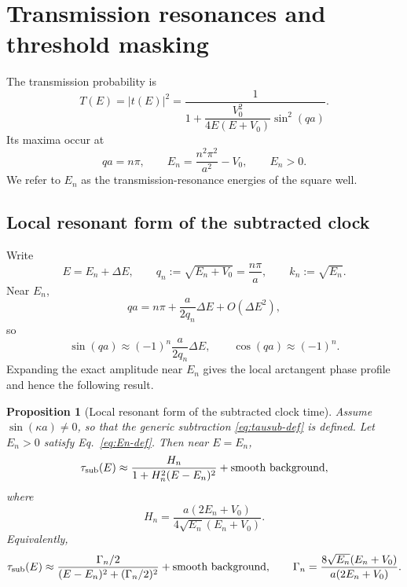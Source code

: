 \documentclass[aps,pra,preprint,notitlepage,nofootinbib]{revtex4-2}
\newtheorem{proposition}{Proposition}
\begin{document}
\section{Transmission resonances and threshold masking}
\label{sec:resonances}

The transmission probability is
\begin{equation}
T(E)=|t(E)|^2=
\frac{1}{1+\dfrac{V_0^2}{4E(E+V_0)}\sin^2(qa)}.
\label{eq:T-exact}
\end{equation}
Its maxima occur at
\begin{equation}
qa=n\pi,
\qquad
E_n=\frac{n^2\pi^2}{a^2}-V_0,
\qquad E_n>0.
\label{eq:En-def}
\end{equation}
We refer to $E_n$ as the transmission-resonance energies of the square well.

\subsection{Local resonant form of the subtracted clock}

Write
\begin{equation}
E=E_n+\Delta E,
\qquad
q_n:=\sqrt{E_n+V_0}=\frac{n\pi}{a},
\qquad
k_n:=\sqrt{E_n}.
\end{equation}
Near $E_n$,
\begin{equation}
qa=n\pi+\frac{a}{2q_n}\Delta E+O(\Delta E^2),
\end{equation}
so
\begin{equation}
\sin(qa)\approx (-1)^n\frac{a}{2q_n}\Delta E,
\qquad
\cos(qa)\approx (-1)^n.
\end{equation}
Expanding the exact amplitude near $E_n$ gives the local arctangent phase profile and hence the following result.

\begin{proposition}[Local resonant form of the subtracted clock time]
Assume \(\sin(\kappa a)\neq0\), so that the generic subtraction
\eqref{eq:tausub-def} is defined. Let \(E_n>0\) satisfy
Eq.~\eqref{eq:En-def}. Then near \(E=E_n\),
\begin{equation}
\tau_{\rm sub}(E)\approx
\frac{H_n}{1+H_n^2(E-E_n)^2}
+\text{smooth background},
\label{eq:tausub-Lorentz}
\end{equation}
where
\begin{equation}
H_n=\frac{a(2E_n+V_0)}{4\sqrt{E_n}(E_n+V_0)}.
\label{eq:Hn-def}
\end{equation}
Equivalently,
\begin{equation}
\tau_{\rm sub}(E)\approx
\frac{\Gamma_n/2}{(E-E_n)^2+(\Gamma_n/2)^2}
+\text{smooth background},
\qquad
\Gamma_n=\frac{8\sqrt{E_n}(E_n+V_0)}{a(2E_n+V_0)}.
\label{eq:Gamma-def}
\end{equation}
\end{proposition}
\end{document}
